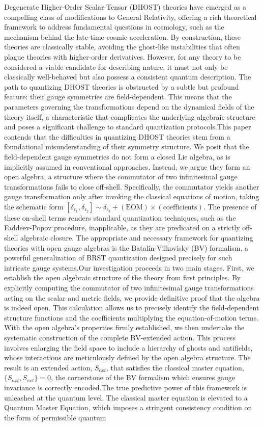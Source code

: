 \documentclass[twocolumn]{aastex631}
\begin{document}
Degenerate Higher-Order Scalar-Tensor (DHOST) theories have emerged as a compelling class of modifications to General Relativity, offering a rich theoretical framework to address fundamental questions in cosmology, such as the mechanism behind the late-time cosmic acceleration. By construction, these theories are classically stable, avoiding the ghost-like instabilities that often plague theories with higher-order derivatives. However, for any theory to be considered a viable candidate for describing nature, it must not only be classically well-behaved but also possess a consistent quantum description. The path to quantizing DHOST theories is obstructed by a subtle but profound feature: their gauge symmetries are field-dependent. This means that the parameters governing the transformations depend on the dynamical fields of the theory itself, a characteristic that complicates the underlying algebraic structure and poses a significant challenge to standard quantization protocols.This paper contends that the difficulties in quantizing DHOST theories stem from a foundational misunderstanding of their symmetry structure. We posit that the field-dependent gauge symmetries do not form a closed Lie algebra, as is implicitly assumed in conventional approaches. Instead, we argue they form an open algebra, a structure where the commutator of two infinitesimal gauge transformations fails to close off-shell. Specifically, the commutator yields another gauge transformation only after invoking the classical equations of motion, taking the schematic form $[\delta_{\epsilon_1}, \delta_{\epsilon_2}] \sim \delta_{\epsilon_3} + (\text{EOM}) \times (\text{coefficients})$. The presence of these on-shell terms renders standard quantization techniques, such as the Faddeev-Popov procedure, inapplicable, as they are predicated on a strictly off-shell algebraic closure. The appropriate and necessary framework for quantizing theories with open gauge algebras is the Batalin-Vilkovisky (BV) formalism, a powerful generalization of BRST quantization designed precisely for such intricate gauge systems.Our investigation proceeds in two main stages. First, we establish the open algebraic structure of the theory from first principles. By explicitly computing the commutator of two infinitesimal gauge transformations acting on the scalar and metric fields, we provide definitive proof that the algebra is indeed open. This calculation allows us to precisely identify the field-dependent structure functions and the coefficients multiplying the equation-of-motion terms. With the open algebra's properties firmly established, we then undertake the systematic construction of the complete BV-extended action. This process involves enlarging the field space to include a hierarchy of ghosts and antifields, whose interactions are meticulously defined by the open algebra structure. The result is an extended action, $S_{ext}$, that satisfies the classical master equation, $\{S_{ext}, S_{ext}\} = 0$, the cornerstone of the BV formalism which ensures gauge invariance is correctly encoded.The true predictive power of this framework is unleashed at the quantum level. The classical master equation is elevated to a Quantum Master Equation, which imposes a stringent consistency condition on the form of permissible quantum 
\end{document}
